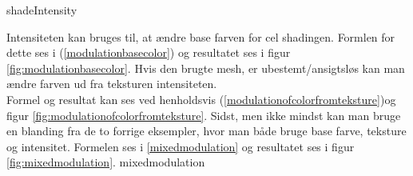  {shadeIntensity} 

Intensiteten kan bruges til, at ændre base farven for cel shadingen. Formlen for dette ses i
(\ref{modulationbasecolor}) og resultatet ses i figur \ref{fig:modulationbasecolor}. 
Hvis den brugte mesh, er ubestemt/ansigtsløs kan man ændre farven ud fra teksturen
intensiteten.
\\
Formel og resultat kan ses ved henholdsvis
(\ref{modulationofcolorfromteksture})og figur \ref{fig:modulationofcolorfromteksture}. Sidst,
men ikke mindst kan man bruge en blanding fra de to forrige eksempler, hvor man både bruge base
farve, teksture og intensitet. Formelen ses i \ref{mixedmodulation} og resultatet ses i figur
\ref{fig:mixedmodulation}.  {mixedmodulation}
